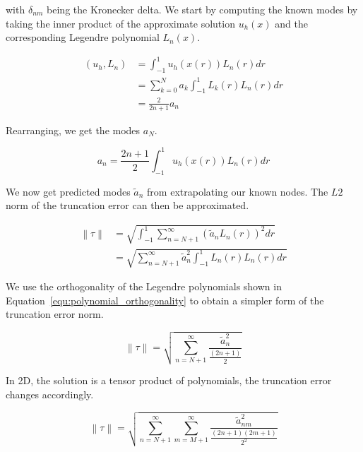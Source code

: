 with $\delta_{nm}$ being the Kronecker delta. We start by computing the known modes by taking the
inner product of the approximate solution $u_h(x)$ and  the corresponding Legendre polynomial
$L_n(x)$.

\begin{equation} \label{equ:modes_inner_product}
	\begin{aligned}
		\left ( u_h, L_n \right ) &= \int_{-1}^{1} u_h(x(r)) L_n(r) dr \\
		&= \sum_{k = 0}^{N} a_k \int_{-1}^{1} L_k(r) L_n(r)dr \\
		&= \frac{2}{2n + 1} a_n
	\end{aligned}
\end{equation}

Rearranging, we get the modes $a_N$.

\begin{equation} \label{equ:modes}
	a_n = \frac{2n + 1}{2}\int_{-1}^{1}u_h(x(r))L_n(r)dr
\end{equation}

We now get predicted modes $\widetilde{a}_n$ from extrapolating our known nodes. The $L2$ norm of
the truncation error can then be approximated.

\begin{equation} \label{equ:error_norm}
	\begin{aligned}
		\left \| \tau \right \| &= \sqrt{\int_{-1}^{1} \sum_{n = N + 1}^{\infty }\left ( \widetilde{a}_n L_n(r) \right )^2 dr} \\
		&= \sqrt{\sum_{n = N + 1}^{\infty }\widetilde{a}_n^2 \int_{-1}^{1} L_n(r) L_n(r) dr}
	\end{aligned}
\end{equation}

We use the orthogonality of the Legendre polynomials shown in
Equation~\ref{equ:polynomial_orthogonality} to obtain a simpler form of the truncation error norm.

\begin{equation} \label{equ:error_norm_1D}
	\left \| \tau \right \| = \sqrt{\sum_{n = N + 1}^{\infty } \frac{\widetilde{a}_{n}^2}{\frac{(2n + 1)}{2}}}
\end{equation}

In 2D, the solution is a tensor product of polynomials, the truncation error changes accordingly. 

\begin{equation} \label{equ:error_norm_2D}
	\left \| \tau \right \| = \sqrt{\sum_{n = N + 1}^{\infty } \sum_{m = M + 1}^{\infty}\frac{\widetilde{a}_{nm}^2}{\frac{(2n + 1)(2m + 1)}{2^2}}}
\end{equation}

